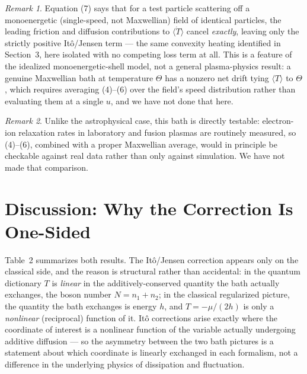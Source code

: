 \documentclass[12pt]{amsart}
\theoremstyle{plain}
\theoremstyle{remark}
\newtheorem*{remark}{Remark}
\begin{document}
\begin{remark}
Equation (7) says that for a test particle scattering off a monoenergetic (single-speed, not Maxwellian) field of identical particles, the leading friction and diffusion contributions to $\langle\dot T\rangle$ cancel \emph{exactly}, leaving only the strictly positive It\^o/Jensen term --- the same convexity heating identified in Section~3, here isolated with no competing loss term at all. This is a feature of the idealized monoenergetic-shell model, not a general plasma-physics result: a genuine Maxwellian bath at temperature $\Theta$ has a nonzero net drift tying $\langle T\rangle$ to $\Theta$, which requires averaging (4)--(6) over the field's speed distribution rather than evaluating them at a single $u$, and we have not done that here.
\end{remark}

\begin{remark}
Unlike the astrophysical case, this bath is directly testable: electron-ion relaxation rates in laboratory and fusion plasmas are routinely measured, so (4)--(6), combined with a proper Maxwellian average, would in principle be checkable against real data rather than only against simulation. We have not made that comparison.
\end{remark}

\section{Discussion: Why the Correction Is One-Sided}

Table~2 summarizes both results. The It\^o/Jensen correction appears only on the classical side, and the reason is structural rather than accidental: in the quantum dictionary $T$ is \emph{linear} in the additively-conserved quantity the bath actually exchanges, the boson number $N=n_1+n_2$; in the classical regularized picture, the quantity the bath exchanges is energy $h$, and $T=-\mu/(2h)$ is only a \emph{nonlinear} (reciprocal) function of it. It\^o corrections arise exactly where the coordinate of interest is a nonlinear function of the variable actually undergoing additive diffusion --- so the asymmetry between the two bath pictures is a statement about which coordinate is linearly exchanged in each formalism, not a difference in the underlying physics of dissipation and fluctuation.
\end{document}
